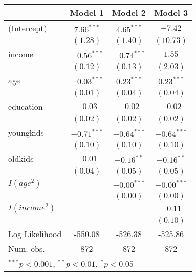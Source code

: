 
\begin{table}[hb!]
\footnotesize
\begin{center}
\begin{tabular}{l c c c }
\toprule
 & Model 1 & Model 2 & Model 3 \\
\midrule
(Intercept)    & $7.66^{***}$  & $4.65^{***}$  & $-7.42$       \\
               & $(1.28)$      & $(1.40)$      & $(10.73)$     \\
income         & $-0.56^{***}$ & $-0.74^{***}$ & $1.55$        \\
               & $(0.12)$      & $(0.13)$      & $(2.03)$      \\
age            & $-0.03^{***}$ & $0.23^{***}$  & $0.23^{***}$  \\
               & $(0.01)$      & $(0.04)$      & $(0.04)$      \\
education      & $-0.03$       & $-0.02$       & $-0.02$       \\
               & $(0.02)$      & $(0.02)$      & $(0.02)$      \\
youngkids      & $-0.71^{***}$ & $-0.64^{***}$ & $-0.64^{***}$ \\
               & $(0.10)$      & $(0.10)$      & $(0.10)$      \\
oldkids        & $-0.01$       & $-0.16^{**}$  & $-0.16^{**}$  \\
               & $(0.04)$      & $(0.05)$      & $(0.05)$      \\
$I(age^2)$       &               & $-0.00^{***}$ & $-0.00^{***}$ \\
               &               & $(0.00)$      & $(0.00)$      \\
$I(income^2)$    &               &               & $-0.11$       \\
               &               &               & $(0.10)$      \\
\midrule
Log Likelihood & -550.08       & -526.38       & -525.86       \\
Num. obs.      & 872           & 872           & 872           \\
\bottomrule
\multicolumn{4}{l}{\scriptsize{$^{***}p<0.001$, $^{**}p<0.01$, $^*p<0.05$}}
\end{tabular}
\label{table:coefficients}
\end{center}
\end{table}
